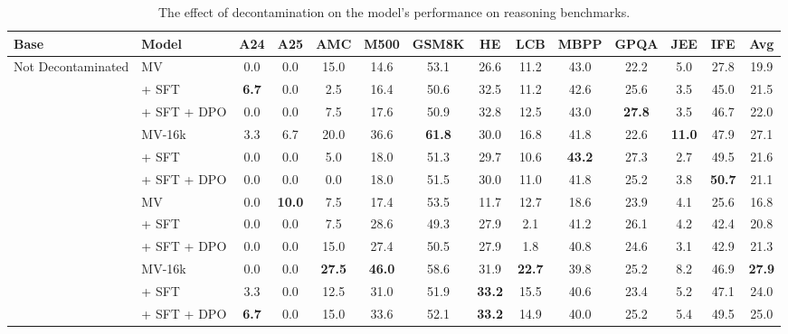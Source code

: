 \begin{table}[ht]
\centering
\caption{The effect of decontamination on the model's performance on reasoning benchmarks.}
\label{tab:evalchemy_table3}
\scriptsize
\begin{tabular}{llcccccccccccc}
\toprule
\textbf{Base} & \textbf{Model} & \textbf{A24} & \textbf{A25} & \textbf{AMC} & \textbf{M500} & \textbf{GSM8K} & \textbf{HE} & \textbf{LCB} & \textbf{MBPP} & \textbf{GPQA} & \textbf{JEE} & \textbf{IFE} & \textbf{Avg} \\
\midrule
\multirow{6}{*}{Not Decontaminated} & MV & 0.0 & 0.0 & 15.0 & 14.6 & 53.1 & 26.6 & 11.2 & 43.0 & 22.2 & 5.0 & 27.8 & 19.9 \\
 & \quad + SFT & \textbf{6.7} & 0.0 & 2.5 & 16.4 & 50.6 & 32.5 & 11.2 & 42.6 & 25.6 & 3.5 & 45.0 & 21.5 \\
 & \quad + SFT + DPO & 0.0 & 0.0 & 7.5 & 17.6 & 50.9 & 32.8 & 12.5 & 43.0 & \textbf{27.8} & 3.5 & 46.7 & 22.0 \\
\cmidrule{2-14}
 & MV-16k & 3.3 & 6.7 & 20.0 & 36.6 & \textbf{61.8} & 30.0 & 16.8 & 41.8 & 22.6 & \textbf{11.0} & 47.9 & 27.1 \\
 & \quad + SFT & 0.0 & 0.0 & 5.0 & 18.0 & 51.3 & 29.7 & 10.6 & \textbf{43.2} & 27.3 & 2.7 & 49.5 & 21.6 \\
 & \quad + SFT + DPO & 0.0 & 0.0 & 0.0 & 18.0 & 51.5 & 30.0 & 11.0 & 41.8 & 25.2 & 3.8 & \textbf{50.7} & 21.1 \\
\midrule
\addlinespace[0.3em]
\multirow{6}{*}{Decontaminated} & MV & 0.0 & \textbf{10.0} & 7.5 & 17.4 & 53.5 & 11.7 & 12.7 & 18.6 & 23.9 & 4.1 & 25.6 & 16.8 \\
 & \quad + SFT & 0.0 & 0.0 & 7.5 & 28.6 & 49.3 & 27.9 & 2.1 & 41.2 & 26.1 & 4.2 & 42.4 & 20.8 \\
 & \quad + SFT + DPO & 0.0 & 0.0 & 15.0 & 27.4 & 50.5 & 27.9 & 1.8 & 40.8 & 24.6 & 3.1 & 42.9 & 21.3 \\
\cmidrule{2-14}
 & MV-16k & 0.0 & 0.0 & \textbf{27.5} & \textbf{46.0} & 58.6 & 31.9 & \textbf{22.7} & 39.8 & 25.2 & 8.2 & 46.9 & \textbf{27.9} \\
 & \quad + SFT & 3.3 & 0.0 & 12.5 & 31.0 & 51.9 & \textbf{33.2} & 15.5 & 40.6 & 23.4 & 5.2 & 47.1 & 24.0 \\
 & \quad + SFT + DPO & \textbf{6.7} & 0.0 & 15.0 & 33.6 & 52.1 & \textbf{33.2} & 14.9 & 40.0 & 25.2 & 5.4 & 49.5 & 25.0 \\
\bottomrule
\end{tabular}
\end{table}


